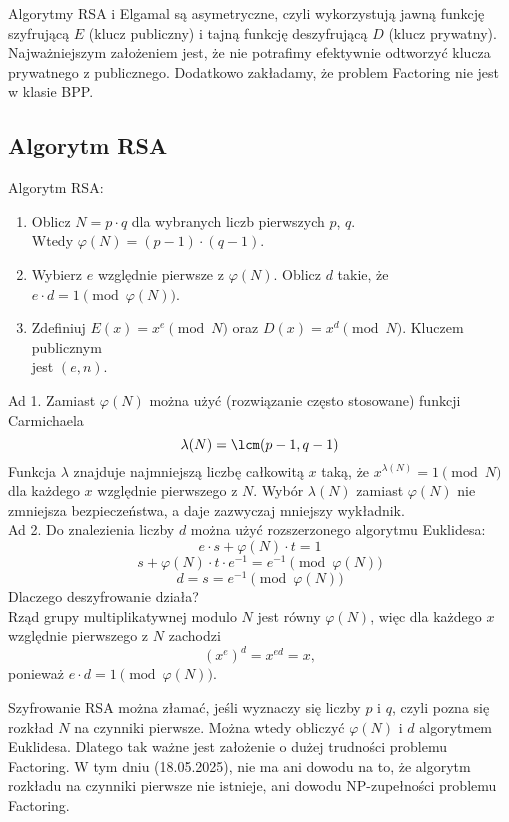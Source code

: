 Algorytmy RSA i Elgamal są asymetryczne, czyli wykorzystują jawną funkcję szyfrującą \( E \) (klucz publiczny) i tajną funkcję deszyfrującą \( D \) (klucz prywatny).
Najważniejszym założeniem jest, że nie potrafimy efektywnie odtworzyć klucza prywatnego z publicznego. Dodatkowo zakładamy, że problem Factoring nie jest w klasie BPP.

\subsection{Algorytm RSA}
\begin{greyframe}
    Algorytm RSA:
    \begin{enumerate}
        \item Oblicz \( N = p \cdot q \) dla wybranych liczb pierwszych \( p \), \( q \). \\
        Wtedy \( \varphi(N) = (p-1) \cdot (q-1) \).
        \item Wybierz \( e \) względnie pierwsze z \( \varphi(N) \). Oblicz \( d \) takie, że  \( e\cdot d = 1 \pmod{\varphi(N)} \).
        \item Zdefiniuj \( E(x) = x^e \pmod{N} \) oraz \( D(x) = x^d \pmod{N} \). Kluczem publicznym \\ jest \( (e, n) \).
    \end{enumerate}
\end{greyframe}

Ad 1. Zamiast \( \varphi(N) \) można użyć (rozwiązanie często stosowane) funkcji Carmichaela
\[
    \lambda(N) = \lcm(p - 1, q - 1)
\]
Funkcja \( \lambda \) znajduje najmniejszą liczbę całkowitą \( x \) taką, że \( x^{\lambda(N)} = 1 \pmod{N} \) dla każdego \( x \) względnie pierwszego z \( N \).
Wybór \( \lambda(N) \) zamiast \( \varphi(N) \) nie zmniejsza bezpieczeństwa, a daje zazwyczaj mniejszy wykładnik. \\
Ad 2. Do znalezienia liczby \( d \) można użyć rozszerzonego algorytmu Euklidesa:
\[
    e \cdot s + \varphi(N) \cdot t = 1
\]
\[
    s + \varphi(N) \cdot t \cdot e^{-1} = e^{-1} \pmod{\varphi(N)}
\]
\[
    d = s = e^{-1} \pmod{\varphi(N)}
\]
Dlaczego deszyfrowanie działa? \\
Rząd grupy multiplikatywnej modulo \( N \) jest równy \( \varphi(N) \), więc dla każdego \( x \) względnie pierwszego z \( N \) zachodzi
\[
    (x^{e})^d = x^{ed} = x,
\]
ponieważ \( e \cdot d = 1 \pmod{\varphi(N)} \).

Szyfrowanie RSA można złamać, jeśli wyznaczy się liczby \( p \) i \( q \), czyli pozna się rozkład \( N \) na czynniki pierwsze.
Można wtedy obliczyć \( \varphi(N) \) i \( d \) algorytmem Euklidesa. Dlatego tak ważne jest założenie o dużej trudności problemu Factoring.
W tym dniu (18.05.2025), nie ma ani dowodu na to, że algorytm rozkładu na czynniki pierwsze nie istnieje, ani dowodu NP-zupełności problemu Factoring.


